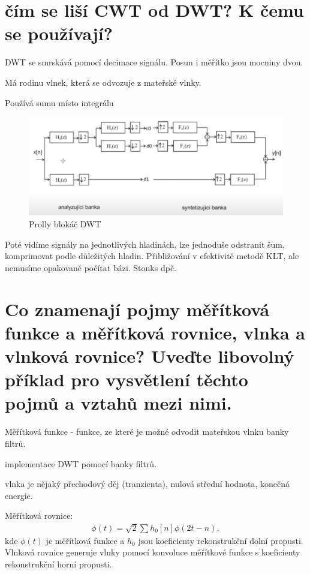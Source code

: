\documentclass[a4paper,12pt]{article}   %
\newcommand{\mt}[1]{$#1$}
\begin{document}
\section{čím se liší CWT od DWT? K čemu se používají?}
DWT se smrskává pomocí decimace signálu. Posun i měřítko jsou mocniny dvou.

Má rodinu vlnek, která se odvozuje z mateřské vlnky.

Používá sumu místo integrálu

\begin{figure}
        \centering
        \includegraphics[width=.8\textwidth]{fig/DWT_blokac.png}
        \caption*{Prolly blokáč DWT}
\end{figure}

Poté vidíme signály na jednotlivých hladinách, lze jednoduše odstranit šum, komprimovat podle důležitých hladin. Přibližování v efektivitě metodě KLT, ale nemusíme opakovaně počítat bázi. Stonks dpč. 


\section{Co znamenají pojmy měřítková funkce a měřítková rovnice, vlnka a vlnková rovnice? Uveďte libovolný příklad pro vysvětlení těchto pojmů a vztahů mezi nimi.}
Měřítková funkce - funkce, ze které je možné odvodit mateřskou vlnku banky filtrů. 

implementace DWT pomocí banky filtrů.

vlnka je nějaký přechodový děj (tranzienta), nulová střední hodnota, konečná energie.

Měřítková rovnice:
\begin{align*}
        \phi(t) = \sqrt{2} \sum h_0[n]\phi(2t-n),
\end{align*}
kde \mt{\phi (t)} je měřítková funkce a \mt{h_0} jsou koeficienty rekonstrukční dolní propusti. Vlnková rovnice generuje vlnky pomocí konvoluce měřítkové funkce s koeficienty rekonstrukční horní propusti. 


\end{document}

